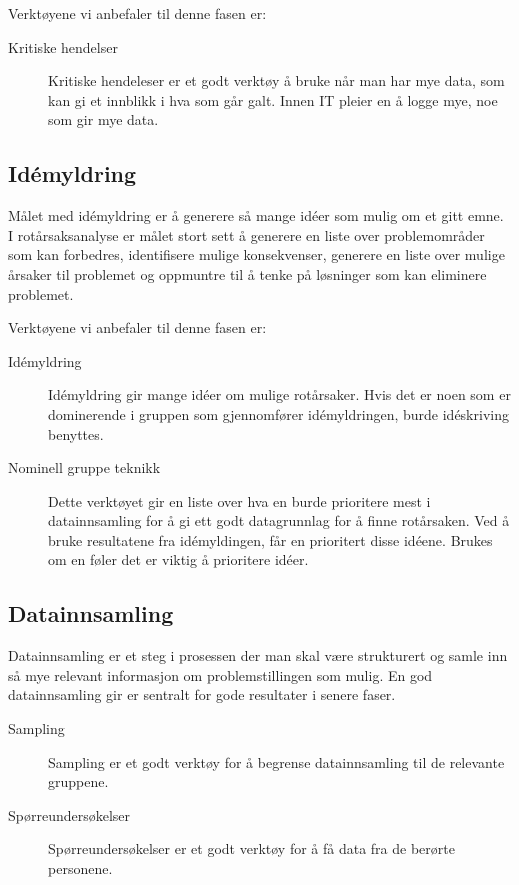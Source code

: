 Verktøyene vi anbefaler til denne fasen er: 
\begin{description}
    \item[Kritiske hendelser] Kritiske hendeleser er et godt verktøy å bruke når man har mye data, som kan gi et innblikk i hva som går galt. Innen IT pleier en å logge mye, noe som gir mye data.
\end{description}



\subsection{Idémyldring}
Målet med idémyldring er å generere så mange idéer som mulig om et gitt emne. I rotårsaksanalyse er målet stort sett å generere en liste over problemområder som kan forbedres, identifisere mulige konsekvenser, generere en liste over mulige årsaker til problemet og oppmuntre til å tenke på løsninger som kan eliminere problemet. 

Verktøyene vi anbefaler til denne fasen er:
\begin{description}
    \item[Idémyldring] Idémyldring gir mange idéer om mulige rotårsaker. Hvis det er noen som er dominerende i gruppen som gjennomfører idémyldringen, burde idéskriving benyttes.
    \item[Nominell gruppe teknikk] Dette verktøyet gir en liste over hva en burde prioritere mest i datainnsamling for å gi ett godt datagrunnlag for å finne rotårsaken. Ved å bruke resultatene fra idémyldingen, får en prioritert disse idéene. Brukes om en føler det er viktig å prioritere idéer.
\end{description}

\subsection{Datainnsamling}
Datainnsamling er et steg i prosessen der man skal være strukturert og samle inn så mye relevant informasjon om problemstillingen som mulig. En god datainnsamling gir er sentralt for gode resultater i senere faser.


\begin{description}
    \item[Sampling] Sampling er et godt verktøy for å begrense datainnsamling til de relevante gruppene. 
    \item[Spørreundersøkelser] Spørreundersøkelser er et godt verktøy for å få data fra de berørte personene. 
\end{description}

